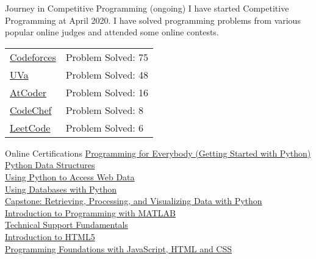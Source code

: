\documentclass{article}
\newlength{\tabin}
\newlength{\secsep}
\newcommand{\lineunder}{\vspace*{-8pt} \\ \hspace*{-6pt} \hrulefill \\ \vspace*{-15pt}}
\newenvironment{tabbedsection}[1]{
  \begin{list}{}{
      \setlength{\itemsep}{0pt}
      \setlength{\labelsep}{0pt}
      \setlength{\labelwidth}{0pt}
      \setlength{\leftmargin}{\tabin}
      \setlength{\rightmargin}{\tabin}
      \setlength{\listparindent}{0pt}
      \setlength{\parsep}{0pt}
      \setlength{\parskip}{0pt}
      \setlength{\partopsep}{0pt}
      \setlength{\topsep}{#1}
    }
  \item[]
}{\end{list}}
\newenvironment{resume_section}[1]{
  \filbreak
  \vspace{2\secsep}
  \textsc{\large#1}
  \lineunder
  \begin{tabbedsection}{\secsep}
}{\end{tabbedsection}}
\begin{document}
  \begin{resume_section}{Journey in Competitive Programming (ongoing)}
    I have started Competitive Programming at April 2020. I have solved programming problems from various popular online judges and attended some online contests.
    
    \vspace{5px}
    \begin{tabularx}{\linewidth}{XX}
     \href{https://codeforces.com/profile/ehsan3p}{Codeforces} & Problem Solved: 75 \\ 
    \href{https://uhunt.onlinejudge.org/id/839904}{UVa} & Problem Solved: 48 \\
    \href{https://atcoder.jp/users/ehsan3p}{AtCoder} & Problem Solved: 16 \\
    \href{https://www.codechef.com/users/pappu3p}{CodeChef} & Problem Solved: 8 \\
    \href{https://leetcode.com/Ehsanul-Karim-Pappu/}{LeetCode} & Problem Solved: 6 \\
  
  \end{tabularx}
    
    
    
  \end{resume_section}







  \begin{resume_section}{Online Certifications}
    \href{https://www.coursera.org/account/accomplishments/certificate/9DMFY8FUWW8A}{Programming for Everybody (Getting Started with Python)} \\
    \href{https://www.coursera.org/account/accomplishments/certificate/3V74VTE84SRX}{Python Data Structures} \\
    \href{https://www.coursera.org/account/accomplishments/certificate/BH5F6RJSHFU2}{Using Python to Access Web Data} \\
    \href{https://www.coursera.org/account/accomplishments/certificate/D4FVJZXPQ8EZ}{Using Databases with Python} \\
    \href{https://www.coursera.org/account/accomplishments/certificate/RG5VD3468YS6}{Capstone: Retrieving, Processing, and Visualizing Data with Python} \\
    \href{https://www.coursera.org/account/accomplishments/certificate/YTG2BAN3KX6Y}{Introduction to Programming with MATLAB} \\
    \href{https://www.coursera.org/account/accomplishments/certificate/4CNW2HNLEZJ9}{Technical Support Fundamentals} \\
    \href{https://www.coursera.org/account/accomplishments/certificate/7DZ7QDAGMY5Q}{Introduction to HTML5} \\
    \href{https://www.coursera.org/account/accomplishments/certificate/5CDPM75SN7NE}{Programming Foundations with JavaScript, HTML and CSS}
  \end{resume_section}
\end{document}
